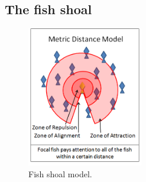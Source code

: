 \subsection{The fish shoal}

\begin{figure}
\centering
\includegraphics[width=0.45\textwidth]{figs/swarmfig.png}
\caption{\label{fig:swarm} Fish shoal model.}
\end{figure}

